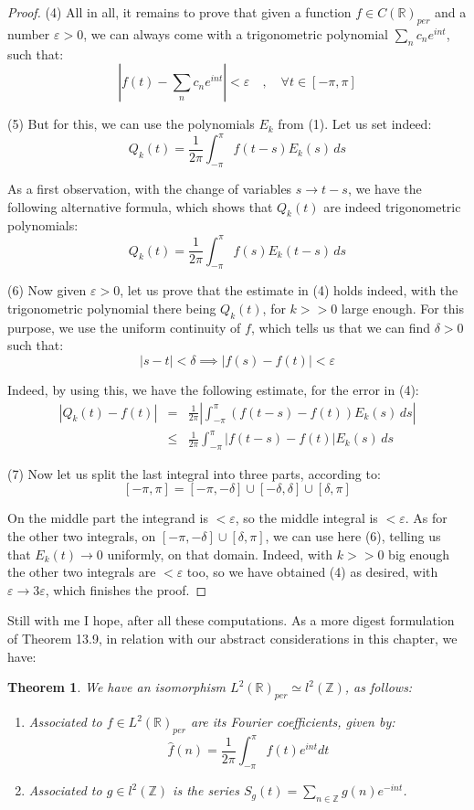 \documentclass[12pt]{amsbook}
\newtheorem{theorem}{Theorem}[chapter]
\begin{document}
\begin{proof}
\medskip

(4) All in all, it remains to prove that given a function $f\in C(\mathbb R)_{per}$ and a number $\varepsilon>0$, we can always come with a trigonometric polynomial $\sum_nc_ne^{int}$, such that:
$$\left|f(t)-\sum_nc_ne^{int}\right|<\varepsilon\quad,\quad\forall t\in[-\pi,\pi]$$

(5) But for this, we can use the polynomials $E_k$ from (1). Let us set indeed:
$$Q_k(t)=\frac{1}{2\pi}\int_{-\pi}^\pi f(t-s)E_k(s)\,ds$$

As a first observation, with the change of variables $s\to t-s$, we have the following alternative formula, which shows that $Q_k(t)$ are indeed trigonometric polynomials:
$$Q_k(t)=\frac{1}{2\pi}\int_{-\pi}^\pi f(s)E_k(t-s)\,ds$$

(6) Now given $\varepsilon>0$, let us prove that the estimate in (4) holds indeed, with the trigonometric polynomial there being $Q_k(t)$, for $k>>0$ large enough. For this purpose, we use the uniform continuity of $f$, which tells us that we can find $\delta>0$ such that:
$$|s-t|<\delta\implies|f(s)-f(t)|<\varepsilon$$

Indeed, by using this, we have the following estimate, for the error in (4):
\begin{eqnarray*}
|Q_k(t)-f(t)|
&=&\frac{1}{2\pi}\left|\int_{-\pi}^\pi(f(t-s)-f(t))E_k(s)\,ds\right|\\
&\leq&\frac{1}{2\pi}\int_{-\pi}^\pi|f(t-s)-f(t)|E_k(s)\,ds
\end{eqnarray*}

(7) Now let us split the last integral into three parts, according to:
$$[-\pi,\pi]=[-\pi,-\delta]\cup[-\delta,\delta]\cup[\delta,\pi]$$

On the middle part the integrand is $<\varepsilon$, so the middle integral is $<\varepsilon$. As for the other two integrals, on $[-\pi,-\delta]\cup[\delta,\pi]$, we can use here (6), telling us that $E_k(t)\to0$ uniformly, on that domain. Indeed, with $k>>0$ big enough the other two integrals are $<\varepsilon$ too, so we have obtained (4) as desired, with $\varepsilon\to3\varepsilon$, which finishes the proof. 
\end{proof}

Still with me I hope, after all these computations. As a more digest formulation of Theorem 13.9, in relation with our abstract considerations in this chapter, we have:

\begin{theorem}
We have an isomorphism $L^2(\mathbb R)_{per}\simeq l^2(\mathbb Z)$, as follows:
\begin{enumerate}
\item Associated to $f\in L^2(\mathbb R)_{per}$ are its Fourier coefficients, given by:
$$\widehat{f}(n)=\frac{1}{2\pi}\int_{-\pi}^\pi f(t)e^{int}dt$$

\item Associated to $g\in l^2(\mathbb Z)$ is the series $S_g(t)=\sum_{n\in\mathbb Z}g(n)e^{-int}$.
\end{enumerate}
\end{theorem}
\end{document}
